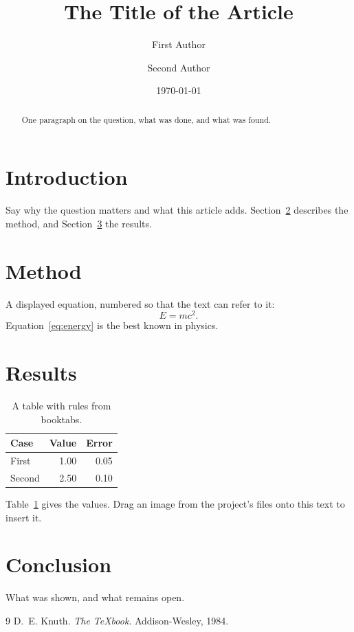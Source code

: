 \documentclass[11pt]{article}
\title{The Title of the Article}
\author{First Author \and Second Author}
\date{\today}
\begin{document}
\maketitle

\begin{abstract}
One paragraph on the question, what was done, and what was found.
\end{abstract}

\section{Introduction}
\label{sec:intro}
Say why the question matters and what this article adds. Section~\ref{sec:method}
describes the method, and Section~\ref{sec:results} the results.

\section{Method}
\label{sec:method}
A displayed equation, numbered so that the text can refer to it:
\begin{equation}
  E = mc^2 .
  \label{eq:energy}
\end{equation}
Equation~\eqref{eq:energy} is the best known in physics.

\section{Results}
\label{sec:results}
\begin{table}[ht]
  \centering
  \caption{A table with rules from booktabs.}
  \label{tab:results}
  \begin{tabular}{lrr}
    \toprule
    Case & Value & Error \\
    \midrule
    First  & 1.00 & 0.05 \\
    Second & 2.50 & 0.10 \\
    \bottomrule
  \end{tabular}
\end{table}
Table~\ref{tab:results} gives the values. Drag an image from the project's files onto this text
to insert it.

\section{Conclusion}
What was shown, and what remains open.

\begin{thebibliography}{9}
 D.~E. Knuth. \emph{The \TeX book}. Addison-Wesley, 1984.
\end{thebibliography}
\end{document}
